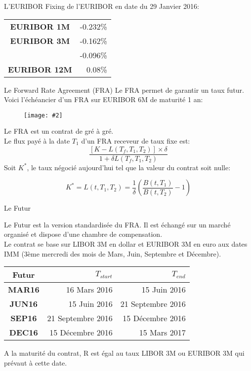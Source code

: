 \documentclass{beamer}
\newcommand{\FIG}[2]{\texttt{[image: \#2]}}
\begin{document}
\begin{frame}{L'EURIBOR}
Fixing de l'EURIBOR en date du 29 Janvier 2016:
\Large
\begin{center}
\begin{tabular}{|c|r|}
  \hline
  \textbf{EURIBOR 1M} & -0.232\% \\
  \textbf{EURIBOR 3M} & -0.162\% \\
  \textbf{\color{red}{EURIBOR 6M}} & -0.096\% \\
  \textbf{EURIBOR 12M} & 0.08\%  \\
  \hline
\end{tabular}
\end{center}
\end{frame}


\begin{frame}{Le Forward Rate Agreement (FRA)}
Le FRA permet de garantir un taux futur.\\
Voici l'échéancier d'un FRA sur EURIBOR 6M de maturité 1 an:
\begin{figure}[h]
\FIG{7cm}{figures/schema_fra.jpg} 
\end{figure}
Le FRA est un contrat de gré à gré.\\
Le flux payé à la date $T_1$ d'un FRA receveur de taux fixe est:
\[
\frac{[K-L(T_f,T_1,T_2)]\times\delta}{1+\delta L(T_f,T_1,T_2)}
\]
Soit $K^*$, le taux négocié aujourd'hui tel que la valeur du contrat soit nulle:

\[
K^*=L(t,T_1, T_2)=\frac{1}{\delta}\left(\frac{B(t,T_1)}{B(t,T_2)}-1\right)
\]
\end{frame}

\begin{frame}{Le Futur}

Le Futur est la version standardisée du FRA. Il est échangé sur un marché organisé et dispose d'une chambre de compensation.\\
Le contrat se base sur LIBOR 3M en dollar et EURIBOR 3M en euro aux dates IMM (3ème mercredi des mois de Mars, Juin, Septembre et Décembre).\\
\begin{center}
\begin{tabular}{|c|r|r|}
  \hline
  \textbf{Futur} & \textbf{$T_{start}$} & \textbf{$T_{end}$} \\
  \hline
  \textbf{MAR16} & 16 Mars 2016 & 15 Juin 2016 \\
  \textbf{JUN16} & 15 Juin 2016 & 21 Septembre 2016 \\
  \textbf{SEP16} & 21 Septembre 2016 & 15 Décembre 2016 \\
  \textbf{DEC16} & 15 Décembre 2016 &  15 Mars 2017 \\
  \hline
\end{tabular}
\end{center}
A la maturité du contrat, R est égal au taux LIBOR 3M ou EURIBOR 3M qui prévaut à cette date.
\end{frame}
\end{document}
